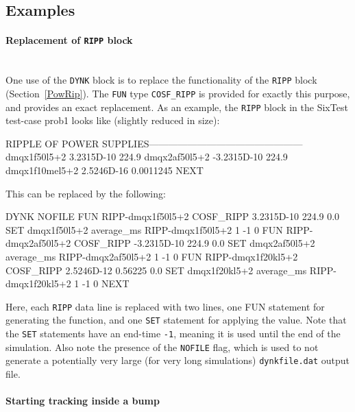 \subsection{Examples}

\paragraph{Replacement of \texttt{RIPP} block}~\\
One use of the \texttt{DYNK} block is to replace the functionality of the \texttt{RIPP} block (Section~\ref{PowRip}).
The \texttt{FUN} type \texttt{COSF\_RIPP} is provided for exactly this purpose, and provides an exact replacement.
As an example, the \texttt{RIPP} block in the SixTest test-case prob1 looks like (slightly reduced in size):
\begin{cverbatim}
RIPPLE OF POWER SUPPLIES------------------------------------------------
         dmqx1f50l5+2      3.2315D-10    224.9
         dmqx2af50l5+2    -3.2315D-10    224.9
         dmqx1f10mel5+2    2.5246D-16    0.0011245
NEXT
\end{cverbatim}
This can be replaced by the following:
\begin{cverbatim}
DYNK
NOFILE
FUN RIPP-dmqx1f50l5+2 COSF_RIPP 3.2315D-10 224.9 0.0
SET dmqx1f50l5+2 average_ms RIPP-dmqx1f50l5+2 1 -1 0
FUN RIPP-dmqx2af50l5+2 COSF_RIPP -3.2315D-10 224.9 0.0
SET dmqx2af50l5+2 average_ms RIPP-dmqx2af50l5+2 1 -1 0
FUN RIPP-dmqx1f20kl5+2 COSF_RIPP 2.5246D-12 0.56225 0.0
SET dmqx1f20kl5+2 average_ms RIPP-dmqx1f20kl5+2 1 -1 0
NEXT
\end{cverbatim}
Here, each \texttt{RIPP} data line is replaced with two lines, one FUN statement for generating the function, and one \texttt{SET} statement for applying the value.
Note that the \texttt{SET} statements have an end-time \texttt{-1}, meaning it is used until the end of the simulation.
Also note the presence of the \texttt{NOFILE} flag, which is used to not generate a potentially very large (for very long simulations) \texttt{dynkfile.dat} output file.

\paragraph{Starting tracking inside a bump}~\\

